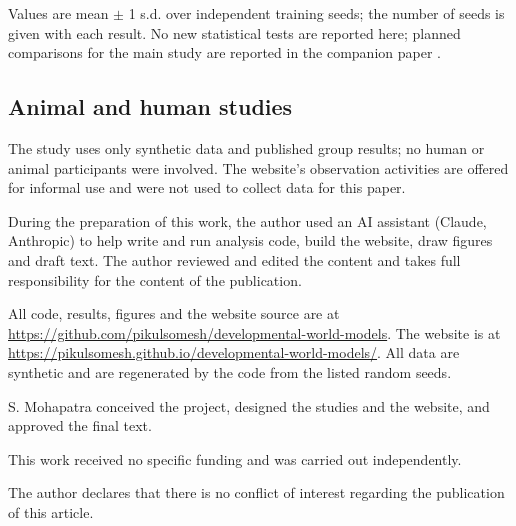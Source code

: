 \documentclass{article}
\begin{document}
Values are mean $\pm$ 1 s.d. over independent training seeds; the number of seeds is given with each result. No new statistical tests are reported here; planned comparisons for the main study are reported in the companion paper \autocite{mohapatra2026learn}.

\subsection{Animal and human studies}

The study uses only synthetic data and published group results; no human or animal participants were involved. The website's observation activities are offered for informal use and were not used to collect data for this paper.

\clearpage
During the preparation of this work, the author used an AI assistant (Claude, Anthropic) to help write and run analysis code, build the website, draw figures and draft text. The author reviewed and edited the content and takes full responsibility for the content of the publication.

All code, results, figures and the website source are at \url{https://github.com/pikulsomesh/developmental-world-models}. The website is at \url{https://pikulsomesh.github.io/developmental-world-models/}. All data are synthetic and are regenerated by the code from the listed random seeds.

S. Mohapatra conceived the project, designed the studies and the website, and approved the final text.

This work received no specific funding and was carried out independently.

The author declares that there is no conflict of interest regarding the publication of this article.

\printbibliography
\end{document}
